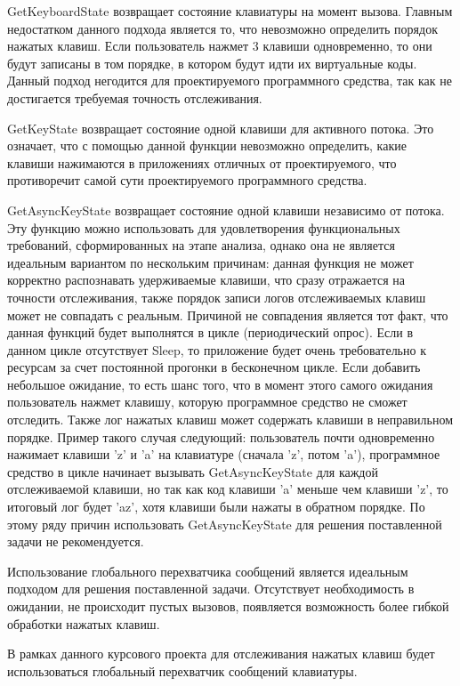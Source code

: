 GetKeyboardState возвращает состояние клавиатуры на момент вызова. Главным недостатком данного подхода является то, что невозможно определить порядок нажатых клавиш. Если пользователь нажмет 3 клавиши одновременно, то они будут записаны в том порядке, в котором будут идти их виртуальные коды. Данный подход негодится для проектируемого программного средства, так как не достигается требуемая точность отслеживания.

GetKeyState возвращает состояние одной клавиши для активного потока. Это означает, что с помощью данной функции невозможно определить, какие клавиши нажимаются в приложениях отличных от проектируемого, что противоречит самой сути проектируемого программного средства.

GetAsyncKeyState возвращает состояние одной клавиши независимо от потока. Эту функцию можно использовать для удовлетворения функциональных требований, сформированных на этапе анализа, однако она не является идеальным вариантом по нескольким причинам: данная функция не может корректно распознавать удерживаемые клавиши, что сразу отражается на точности отслеживания, также порядок записи логов отслеживаемых клавиш может не совпадать с реальным. Причиной не совпадения является тот факт, что данная функций будет выполнятся в цикле (периодический опрос). Если в данном цикле отсутствует Sleep, то приложение будет очень требовательно к ресурсам за счет постоянной прогонки в бесконечном цикле. Если добавить небольшое ожидание, то есть шанс того, что в момент этого самого ожидания пользователь нажмет клавишу, которую программное средство не сможет отследить. Также лог нажатых клавиш может содержать клавиши в неправильном порядке. Пример такого случая следующий: пользователь почти одновременно нажимает клавиши 'z' и 'a' на клавиатуре (сначала 'z', потом 'a'), программное средство в цикле начинает вызывать GetAsyncKeyState для каждой отслеживаемой клавиши, но так как код клавиши 'a' меньше чем клавиши 'z', то итоговый лог будет 'az', хотя клавиши были нажаты в обратном порядке. По этому ряду причин использовать GetAsyncKeyState для решения поставленной задачи не рекомендуется.

Использование глобального перехватчика сообщений является идеальным подходом для решения поставленной задачи. Отсутствует необходимость в ожидании, не происходит пустых вызовов, появляется возможность более гибкой обработки нажатых клавиш.

В рамках данного курсового проекта для отслеживания нажатых клавиш будет использоваться глобальный перехватчик сообщений клавиатуры.

